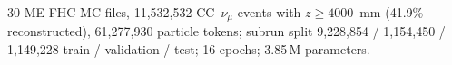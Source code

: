 30 ME FHC MC files, 11{,}532{,}532 CC~$\nu_\mu$ events with $z \ge 4000$~mm (41.9\% reconstructed), 61{,}277{,}930 particle tokens; subrun split 9{,}228{,}854 / 1{,}154{,}450 / 1{,}149{,}228 train / validation / test; 16 epochs; 3.85\,M parameters.
